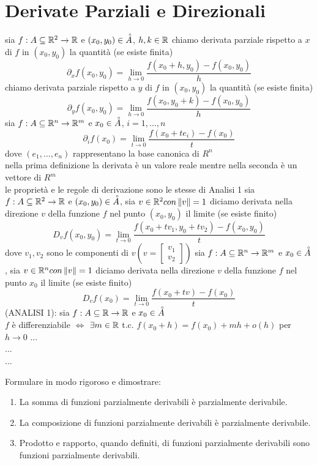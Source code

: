 \section{Derivate Parziali e Direzionali}
sia $f:A\subseteq\mathbb{R}^2\rightarrow\mathbb{R}$ e $(x_0,y_0)\in\accentset{\circ}{A}$, $h,k\in\mathbb{R}$
chiamo derivata parziale rispetto a $x$ di $f$ in $(x_0,y_0)$ la quantità (se esiste finita)
$$\partial_xf(x_0,y_0) = \lim\limits_{h\rightarrow{0}}\frac{f(x_0+h,y_0)-f(x_0,y_0)}{h}$$
chiamo derivata parziale rispetto a $y$ di $f$ in $(x_0,y_0)$ la quantità (se esiste finita)
$$\partial_yf(x_0,y_0) = \lim\limits_{h\rightarrow{0}}\frac{f(x_0,y_0+k)-f(x_0,y_0)}{h}$$
sia $f:A\subseteq\mathbb{R}^n\rightarrow\mathbb{R}^m$ e $x_0\in\accentset{\circ}{A}$, $i=1,...,n$
$$\partial_if(x_0) = \lim\limits_{t\rightarrow{0}}\frac{f(x_0+te_i)-f(x_0)}{t}$$
dove $(e_1,...,e_n)$ rappresentano la base canonica di $R^n$\\
\observation nella prima definizione la derivata è un valore reale mentre nella seconda è un vettore di $R^m$\\
\observation le proprietà e le regole di derivazione sono le stesse di Analisi 1
sia $f:A\subseteq\mathbb{R}^2\rightarrow\mathbb{R}$ e $(x_0,y_0)\in\accentset{\circ}{A}$, sia $v\in\mathbb{R}^2 con \left\|v\right\|=1 $
diciamo derivata nella direzione $v$ della funzione $f$ nel punto $(x_0,y_0)$ il limite (se esiste finito)\\
$$D_vf(x_0,y_0) = \lim\limits_{t\rightarrow{0}}\frac{f(x_0+tv_1,y_0+tv_2)-f(x_0,y_0)}{t}$$
dove $v_1,v_2$ sono le componenti di $v(v=\begin{bmatrix}v_1\\v_2\end{bmatrix})$
sia $f:A\subseteq\mathbb{R}^n\rightarrow\mathbb{R}^m$ e $x_0\in\accentset{\circ}{A}$, sia $v\in\mathbb{R}^n con \left\|v\right\|=1 $
diciamo derivata nella direzione $v$ della funzione $f$ nel punto $x_0$ il limite (se esiste finito)\\
$$D_vf(x_0) = \lim\limits_{t\rightarrow{0}}\frac{f(x_0+tv)-f(x_0)}{t}$$
\proposition
(ANALISI 1): sia $f:A\subseteq \mathbb{R}\rightarrow\mathbb{R}$ e $x_0\in\accentset{\circ}{A}$\\
$f$ è differenziabile $\iff$ $\exists m\in \mathbb{R} $ t.c. $f(x_0+h)=f(x_0)+mh+o(h)$ per $h\rightarrow 0$
...\\
...\\
...\\
\begin{exercise}
	\label{ex:funz_derivabili}
	Formulare in modo rigoroso e dimostrare:
	\begin{enumerate}
		\item La somma di funzioni parzialmente derivabili è parzialmente derivabile.
		\item La composizione di funzioni parzialmente derivabili è parzialmente derivabile.
		\item Prodotto e rapporto, quando definiti, di funzioni parzialmente derivabili sono funzioni parzialmente derivabili.
	\end{enumerate}
\end{exercise}

